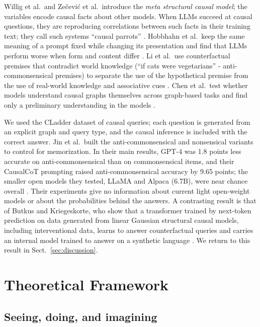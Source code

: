 \documentclass{llncs}
\begin{document}
 Willig et al.\ and Zečević et al.\ introduce the \textit{meta structural causal model}; the variables encode causal facts about other models. When LLMs succeed at causal questions, they are reproducing correlations between such facts in their training text; they call such systems ``causal parrots'' \cite{willig2022can,Zecevic2023CausalPL}. Hobbhahn et al.\ keep the same meaning of a prompt fixed while changing its presentation and find that LLMs perform worse when form and content differ \cite{hobbhahn2022investigating}. Li et al.\ use counterfactual premises that contradict world knowledge (``if cats were vegetarians'' - anti-commonsensical premises) to separate the use of the hypothetical premise from the use of real-world knowledge and associative cues \cite{li2023counterfactual}. Chen et al.\ test whether models understand causal graphs themselves across graph-based tasks and find only a preliminary understanding in the models \cite{chen2024clear}.

We used the CLadder \cite{jin2023cladder} dataset of causal queries; each question is generated from an explicit graph and query type, and the causal inference is included with the correct answer. Jin et al.\ built the anti-commonsensical and nonsensical variants to control for memorization. In their main results, GPT-4 was 1.8 points less accurate on anti-commonsensical than on commonsensical items, and their CausalCoT prompting raised anti-commonsensical accuracy by 9.65 points; the smaller open models they tested, LLaMA and Alpaca (6.7B), were near chance overall \cite{jin2023cladder}. Their experiments give no information about current light open-weight models or about the probabilities behind the answers. A contrasting result is that of Butkus and Kriegeskorte, who show that a transformer trained by next-token prediction on data generated from linear Gaussian structural causal models, including interventional data, learns to answer counterfactual queries and carries an internal model trained to answer on a synthetic language \cite{butkus2025causal}. We return to this result in Sect.~\ref{sec:discussion}.

\section{Theoretical Framework}
\label{sec:theory}

\subsection{Seeing, doing, and imagining}
\label{sec:ladder}
\end{document}
